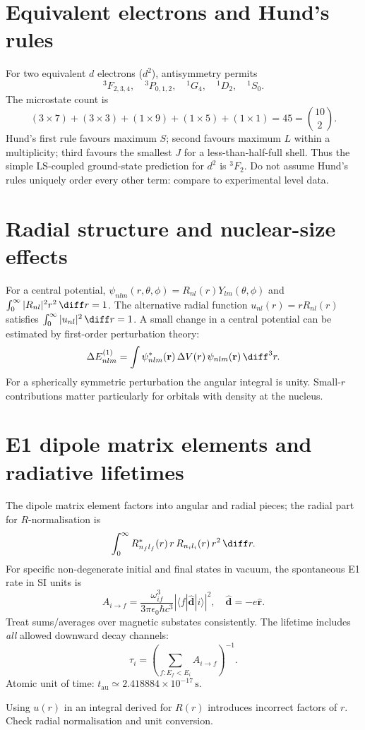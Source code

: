 
\section{Equivalent electrons and Hund's rules}
For two equivalent \(d\) electrons (\(d^2\)), antisymmetry permits
\[
{}^3F_{2,3,4},\quad {}^3P_{0,1,2},\quad
{}^1G_4,\quad {}^1D_2,\quad {}^1S_0.
\]
The microstate count is
\[
(3\times7)+(3\times3)+(1\times9)+(1\times5)+(1\times1)
=45=\binom{10}{2}.
\]
Hund's first rule favours maximum \(S\); second favours maximum \(L\)
within a multiplicity; third favours the smallest \(J\) for a less-than-half-full
shell. Thus the simple LS-coupled ground-state prediction for \(d^2\)
is \({}^3F_2\). Do not assume Hund's rules uniquely order every
other term: compare to experimental level data.

\section{Radial structure and nuclear-size effects}
For a central potential,
\(\psi_{nlm}(r,\theta,\phi)=R_{nl}(r)Y_{lm}(\theta,\phi)\)
and \(\int_0^\infty|R_{nl}|^2r^2\,\diff r=1\).
The alternative radial function \(u_{nl}(r)=rR_{nl}(r)\) satisfies
\(\int_0^\infty|u_{nl}|^2\,\diff r=1\).
A small change in a central potential can be estimated by first-order
perturbation theory:
\[
\Delta E_{nlm}^{(1)}
=\int\psi_{nlm}^*(\mathbf r)\,\Delta V(r)\,
\psi_{nlm}(\mathbf r)\,\diff^3r.
\]
For a spherically symmetric perturbation the angular integral is unity.
Small-\(r\) contributions matter particularly for orbitals with density
at the nucleus.

\section{E1 dipole matrix elements and radiative lifetimes}
The dipole matrix element factors into angular and radial pieces;
the radial part for \(R\)-normalisation is
\[
\int_0^\infty R_{n_fl_f}^*(r)\,r\,R_{n_il_i}(r)\,r^2\,\diff r.
\]
For specific non-degenerate initial and final states in vacuum,
the spontaneous E1 rate in SI units is
\[
A_{i\to f}=\frac{\omega_{if}^3}{3\pi\epsilon_0\hbar c^3}
\left|\langle f|\hat{\mathbf d}|i\rangle\right|^2,
\quad \hat{\mathbf d}=-e\hat{\mathbf r}.
\]
Treat sums/averages over magnetic substates consistently.
The lifetime includes \emph{all} allowed downward decay channels:
\[
\boxed{\tau_i=\left(\sum_{f:E_f<E_i} A_{i\to f}\right)^{-1}.}
\]
Atomic unit of time: \(t_{\mathrm{au}}\simeq2.418884\times10^{-17}\,\mathrm s\).
\begin{cautionbox}
Using \(u(r)\) in an integral derived for \(R(r)\) introduces incorrect
factors of \(r\). Check radial normalisation and unit conversion.
\end{cautionbox}
